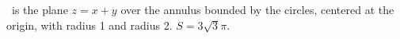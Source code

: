 {\surfaceS\ is the plane $z=x+y$ over the annulus bounded by the circles, centered at the origin, with radius 1 and radius 2.
}
{$S = 3\sqrt{3}\pi$.
}
